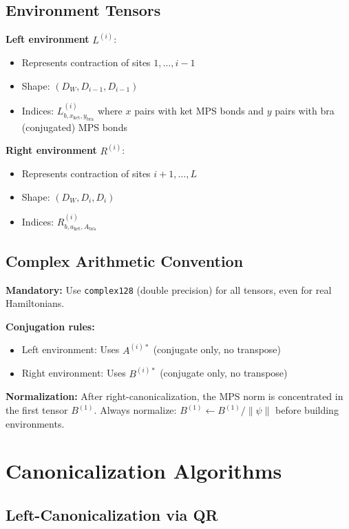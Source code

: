 \documentclass[aps,prb,onecolumn,scriptaddress]{revtex4-2}
\begin{document}
	\subsection{Environment Tensors}
	
	\textbf{Left environment} $L^{(i)}$:
	\begin{itemize}
		\item Represents contraction of sites $1, \ldots, i-1$
		\item Shape: $(D_W, D_{i-1}, D_{i-1})$
		\item Indices: $L^{(i)}_{b, x_{\text{ket}}, y_{\text{bra}}}$ where $x$ pairs with ket MPS bonds and $y$ pairs with bra (conjugated) MPS bonds
	\end{itemize}
	
	\textbf{Right environment} $R^{(i)}$:
	\begin{itemize}
		\item Represents contraction of sites $i+1, \ldots, L$
		\item Shape: $(D_W, D_i, D_i)$
		\item Indices: $R^{(i)}_{b, a_{\text{ket}}, A_{\text{bra}}}$
	\end{itemize}
	
	\subsection{Complex Arithmetic Convention}
	
	\textbf{Mandatory:} Use \texttt{complex128} (double precision) for all tensors, even for real Hamiltonians.
	
	\textbf{Conjugation rules:}
	\begin{itemize}
		\item Left environment: Uses $A^{(i)*}$ (conjugate only, no transpose)
		\item Right environment: Uses $B^{(i)*}$ (conjugate only, no transpose)
	\end{itemize}
	
	\textbf{Normalization:} After right-canonicalization, the MPS norm is concentrated in the first tensor $B^{(1)}$. Always normalize: $B^{(1)} \leftarrow B^{(1)} / \|\psi\|$ before building environments.
	
	\section{Canonicalization Algorithms}
	
	\subsection{Left-Canonicalization via QR}
	
\end{document}
